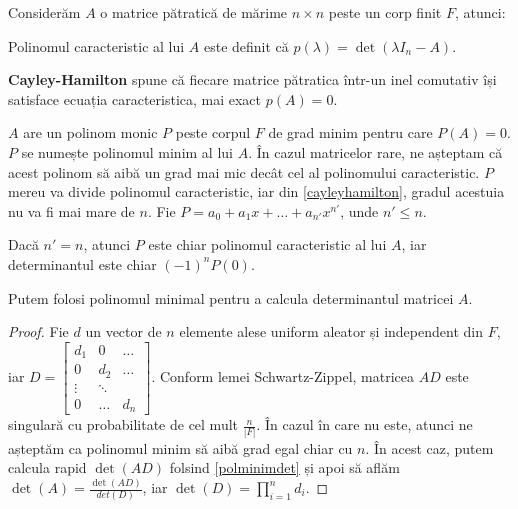 Considerăm $A$ o matrice pătratică de mărime $n \times n$ peste un corp finit $F$, atunci:

\begin{defn}
  Polinomul caracteristic al lui $A$ este definit că
  $p(\lambda) = \det(\lambda I_{n} - A)$.
\end{defn}

\begin{thm}
  \label{cayleyhamilton}
  \textbf{Cayley-Hamilton} spune că fiecare matrice pătratica într-un inel
  comutativ își satisface ecuația caracteristica, mai exact $p(A) = 0$.
\end{thm}

$A$ are un polinom monic $P$ peste corpul $F$ de grad minim pentru care
$P(A) = 0$. $P$ se numește polinomul minim al lui $A$. În
cazul matricelor rare, ne așteptam că acest polinom să aibă un grad mai mic
decât cel al polinomului caracteristic. $P$ mereu va divide polinomul
caracteristic, iar din \ref{cayleyhamilton}, gradul acestuia nu va fi mai mare
de $n$. Fie $P = a_{0} + a_{1}x + \ldots + a_{n'}x^{n'}$, unde $n' \leq n$.

\begin{lem}
  \label{polminimdet}
  Dacă $n' = n$, atunci $P$ este chiar polinomul caracteristic al lui $A$, iar
  determinantul este chiar $(-1)^{n}P(0)$.
\end{lem}

\begin{lem}
  Putem folosi polinomul minimal pentru a calcula determinantul matricei $A$.
\end{lem}

\begin{proof}
  Fie $d$ un vector de $n$ elemente
  alese uniform aleator și independent din $F$, iar
  $D =
  \begin{bmatrix}
    d_{1} & 0 & \dots \\
    0 & d_{2} & \dots \\
    \vdots & \ddots & \\
    0 & \dots & d_{n}
  \end{bmatrix}$. Conform lemei Schwartz-Zippel, matricea $AD$ este singulară cu
  probabilitate de cel mult $\frac{n}{|F|}$. În cazul în care nu este, atunci ne
  așteptăm ca polinomul minim să aibă grad egal chiar cu $n$. În acest caz,
  putem calcula rapid $\det(AD)$ folsind \ref{polminimdet} și apoi să aflăm
  $\det(A) = \frac{\det(AD)}{det(D)}$, iar $\det(D) = \prod_{i=1}^{n} d_{i}$.
\end{proof}

